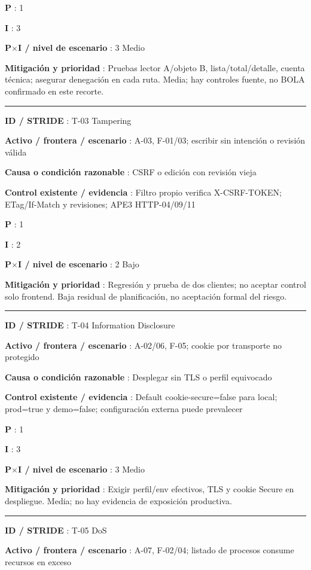 \documentclass[12pt,a4paper]{report}
\begin{document}
\textbf{P }: 1

\textbf{I }: 3

\textbf{P\ensuremath{\times}I / nivel de escenario }: 3 Medio

\textbf{Mitigación y prioridad }: Pruebas lector A/objeto B,
lista/total/detalle, cuenta técnica; asegurar denegación en cada ruta.
Media; hay controles fuente, no BOLA confirmado en este recorte.

\medskip\hrule\medskip

\textbf{ID / STRIDE }: T-03 Tampering

\textbf{Activo / frontera / escenario }: A-03, F-01/03; escribir sin
intención o revisión válida

\textbf{Causa o condición razonable }: CSRF o edición con revisión vieja

\textbf{Control existente / evidencia }: Filtro propio verifica
X-CSRF-TOKEN; ETag/If-Match y revisiones; APE3 HTTP-04/09/11

\textbf{P }: 1

\textbf{I }: 2

\textbf{P\ensuremath{\times}I / nivel de escenario }: 2 Bajo

\textbf{Mitigación y prioridad }: Regresión y prueba de dos clientes; no
aceptar control solo frontend. Baja residual de planificación, no
aceptación formal del riesgo.

\medskip\hrule\medskip

\textbf{ID / STRIDE }: T-04 Information Disclosure

\textbf{Activo / frontera / escenario }: A-02/06, F-05; cookie por
transporte no protegido

\textbf{Causa o condición razonable }: Desplegar sin TLS o perfil
equivocado

\textbf{Control existente / evidencia }: Default cookie-secure=false
para local; prod=true y demo=false; configuración externa puede
prevalecer

\textbf{P }: 1

\textbf{I }: 3

\textbf{P\ensuremath{\times}I / nivel de escenario }: 3 Medio

\textbf{Mitigación y prioridad }: Exigir perfil/env efectivos, TLS y
cookie Secure en despliegue. Media; no hay evidencia de exposición
productiva.

\medskip\hrule\medskip

\textbf{ID / STRIDE }: T-05 DoS

\textbf{Activo / frontera / escenario }: A-07, F-02/04; listado de
procesos consume recursos en exceso
\end{document}
